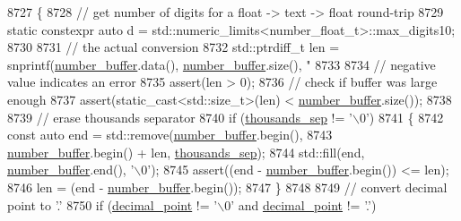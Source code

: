 \begin{DoxyCode}
8727     \{
8728         \textcolor{comment}{// get number of digits for a float -> text -> float round-trip}
8729         \textcolor{keyword}{static} constexpr \textcolor{keyword}{auto} d = std::numeric\_limits<number\_float\_t>::max\_digits10;
8730 
8731         \textcolor{comment}{// the actual conversion}
8732         std::ptrdiff\_t len = snprintf(\hyperlink{classnlohmann_1_1detail_1_1serializer_a1a9d8b344a6cb47728a3519693ec03d1}{number\_buffer}.data(), 
      \hyperlink{classnlohmann_1_1detail_1_1serializer_a1a9d8b344a6cb47728a3519693ec03d1}{number\_buffer}.size(), \textcolor{stringliteral}{"%
8733 
8734         \textcolor{comment}{// negative value indicates an error}
8735         assert(len > 0);
8736         \textcolor{comment}{// check if buffer was large enough}
8737         assert(static\_cast<std::size\_t>(len) < \hyperlink{classnlohmann_1_1detail_1_1serializer_a1a9d8b344a6cb47728a3519693ec03d1}{number\_buffer}.size());
8738 
8739         \textcolor{comment}{// erase thousands separator}
8740         \textcolor{keywordflow}{if} (\hyperlink{classnlohmann_1_1detail_1_1serializer_a78a6ae833bb6cf7f00cb0d51db114b14}{thousands\_sep} != \textcolor{charliteral}{'\(\backslash\)0'})
8741         \{
8742             \textcolor{keyword}{const} \textcolor{keyword}{auto} end = std::remove(\hyperlink{classnlohmann_1_1detail_1_1serializer_a1a9d8b344a6cb47728a3519693ec03d1}{number\_buffer}.begin(),
8743                                          \hyperlink{classnlohmann_1_1detail_1_1serializer_a1a9d8b344a6cb47728a3519693ec03d1}{number\_buffer}.begin() + len, 
      \hyperlink{classnlohmann_1_1detail_1_1serializer_a78a6ae833bb6cf7f00cb0d51db114b14}{thousands\_sep});
8744             std::fill(end, \hyperlink{classnlohmann_1_1detail_1_1serializer_a1a9d8b344a6cb47728a3519693ec03d1}{number\_buffer}.end(), \textcolor{charliteral}{'\(\backslash\)0'});
8745             assert((end - \hyperlink{classnlohmann_1_1detail_1_1serializer_a1a9d8b344a6cb47728a3519693ec03d1}{number\_buffer}.begin()) <= len);
8746             len = (end - \hyperlink{classnlohmann_1_1detail_1_1serializer_a1a9d8b344a6cb47728a3519693ec03d1}{number\_buffer}.begin());
8747         \}
8748 
8749         \textcolor{comment}{// convert decimal point to '.'}
8750         \textcolor{keywordflow}{if} (\hyperlink{classnlohmann_1_1detail_1_1serializer_a311e5d6f4b31d5be0eb3c0cb20b6965a}{decimal\_point} != \textcolor{charliteral}{'\(\backslash\)0'} and \hyperlink{classnlohmann_1_1detail_1_1serializer_a311e5d6f4b31d5be0eb3c0cb20b6965a}{decimal\_point} != \textcolor{charliteral}{'.'})
}
\end{DoxyCode}
